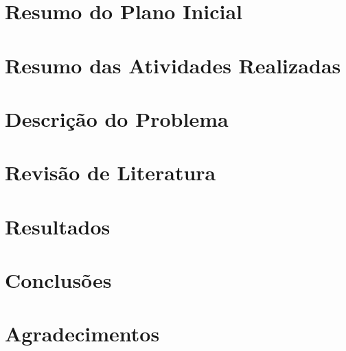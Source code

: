 \documentclass[12pt,a4paper]{article}
\begin{document}
\frenchspacing



\newpage


\newpage


\newpage
\tableofcontents
\newpage

\section*{Resumo do Plano Inicial}



\newpage

\section*{Resumo das Atividades Realizadas}



\newpage

\section{Descrição do Problema}



\section{Revisão de Literatura}



\section{Resultados}



\section{Conclusões}



\section*{Agradecimentos}



\newpage
{}
{}

\end{document}
